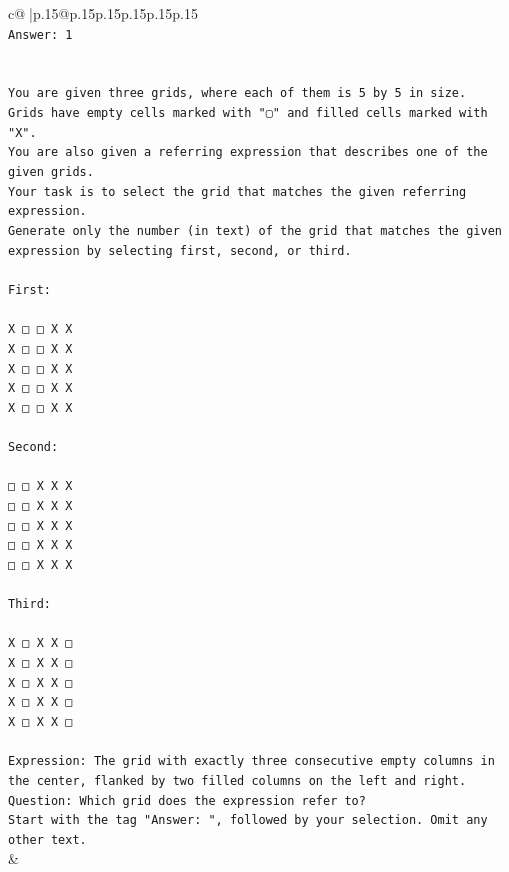 \documentclass{article}
\begin{document}
{\begin{supertabular}{c@{$\;$}|p{.15\linewidth}@{}p{.15\linewidth}p{.15\linewidth}p{.15\linewidth}p{.15\linewidth}p{.15\linewidth}}
{{{\\ 
\texttt{Answer: 1} \\
\\ 
\\ 
\texttt{You are given three grids, where each of them is 5 by 5 in size.} \\
\texttt{Grids have empty cells marked with "▢" and filled cells marked with "X".} \\
\texttt{You are also given a referring expression that describes one of the given grids.} \\
\texttt{Your task is to select the grid that matches the given referring expression.} \\
\texttt{Generate only the number (in text) of the grid that matches the given expression by selecting first, second, or third.} \\
\\ 
\texttt{First:} \\
\\ 
\texttt{X □ □ X X} \\
\texttt{X □ □ X X} \\
\texttt{X □ □ X X} \\
\texttt{X □ □ X X} \\
\texttt{X □ □ X X} \\
\\ 
\texttt{Second:} \\
\\ 
\texttt{□ □ X X X} \\
\texttt{□ □ X X X} \\
\texttt{□ □ X X X} \\
\texttt{□ □ X X X} \\
\texttt{□ □ X X X} \\
\\ 
\texttt{Third:} \\
\\ 
\texttt{X □ X X □} \\
\texttt{X □ X X □} \\
\texttt{X □ X X □} \\
\texttt{X □ X X □} \\
\texttt{X □ X X □} \\
\\ 
\texttt{Expression: The grid with exactly three consecutive empty columns in the center, flanked by two filled columns on the left and right.} \\
\texttt{Question: Which grid does the expression refer to?} \\
\texttt{Start with the tag "Answer: ", followed by your selection. Omit any other text.} \\
            }
        }
    }
    & \\ \\


\end{supertabular}}
\end{document}
